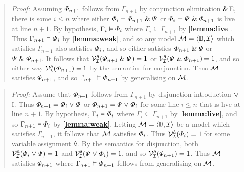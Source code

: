 \label{rule:ConE}

\begin{quote} 
  \textit{Proof:} Assuming $\varPhi_{n+1}$ follows from $\Gamma_{n+1}$ by conjunction elimination $\mathrel\&$E, there is some $i\leq n$ where either $\varPhi_i=\varPhi_{n+1}\mathrel\&\varPsi$ or $\varPhi_i=\varPsi\mathrel\&\varPhi_{n+1}$ is live at line $n+1$.
  By hypothesis, $\Gamma_i\vDash \varPhi_i$ where $\Gamma_i\subseteq \Gamma_{n+1}$ by \textbf{\ref{lemma:live}}.
  Thus $\Gamma_{n+1} \vDash \varPhi_i$ by \textbf{\ref{lemma:weak}}, and so any model $\mathcal{M}=\langle\mathbb{D},\mathcal{I}\rangle$ which satisfies $\Gamma_{n+1}$ also satisfies $\varPhi_i$, and so either satisfies $\varPhi_{n+1}\mathrel\&\varPsi$ or $\varPsi\mathrel\&\varPhi_{n+1}$.
  It follows that $\mathcal{V}_{\mathcal{I}}^{\hat{a}}(\varPhi_{n+1}\mathrel\&\varPsi)=1$ or $\mathcal{V}_{\mathcal{I}}^{\hat{a}}(\varPsi\mathrel\&\varPhi_{n+1})=1$, and so either way $\mathcal{V}_{\mathcal{I}}^{\hat{a}}(\varPhi_{n+1})=1$ by the semantics for conjunction.
  Thus $\mathcal{M}$ satisfies $\varPhi_{n+1}$, and so $\Gamma_{n+1} \vDash \varPhi_{n+1}$ by generalising on $\mathcal{M}$.
\end{quote}




\label{rule:DisI}

\begin{quote} 
  \textit{Proof:} Assume that $\varPhi_{n+1}$ follows from $\Gamma_{n+1}$ by disjunction introduction $\mkern1mu\vee\mkern1mu$I.
  Thus $\varPhi_{n+1}=\varPhi_i\mkern1mu\vee\mkern1mu\varPsi$ or $\varPhi_{n+1}=\varPsi\mkern1mu\vee\mkern1mu\varPhi_i$ for some line $i\leq n$ that is live at line $n+1$.
  By hypothesis, $\Gamma_i\vDash \varPhi_i$ where $\Gamma_i\subseteq \Gamma_{n+1}$ by \textbf{\ref{lemma:live}}, and so $\Gamma_{n+1} \vDash \varPhi_i$ by \textbf{\ref{lemma:weak}}.
  Letting $\mathcal{M}=\langle\mathbb{D},\mathcal{I}\rangle$ be a model which satisfies $\Gamma_{n+1}$, it follows that $\mathcal{M}$ satisfies $\varPhi_i$.
  Thus $\mathcal{V}_{\mathcal{I}}^{\hat{a}}(\varPhi_i)=1$ for some variable assignment $\hat{a}$.
  By the semantics for disjunction, both $\mathcal{V}_{\mathcal{I}}^{\hat{a}}(\varPhi_{i}\mkern1mu\vee\mkern1mu\varPsi)=1$ and $\mathcal{V}_{\mathcal{I}}^{\hat{a}}(\varPsi\mkern1mu\vee\mkern1mu\varPhi_{i})=1$, and so $\mathcal{V}_{\mathcal{I}}^{\hat{a}}(\varPhi_{n+1})=1$.
  Thus $\mathcal{M}$ satisfies $\varPhi_{n+1}$ where $\Gamma_{n+1} \vDash \varPhi_{n+1}$ follows from generalising on $\mathcal{M}$.
\end{quote}




